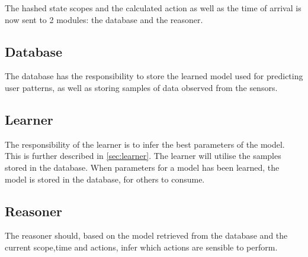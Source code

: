 The hashed state scopes and the calculated action as well as the time of arrival is now sent to 2 modules: the database and the reasoner.

\subsection{Database}
The database has the responsibility to store the learned model used for predicting user patterns, as well as storing samples of data observed from the sensors.

\subsection{Learner}
The responsibility of the learner is to infer the best parameters of the model. This is further described in \cref{sec:learner}. The learner will utilise the samples stored in the database. When parameters for a model has been learned, the model is stored in the database, for others to consume.

\subsection{Reasoner}
The reasoner should, based on the model retrieved from the database and the current scope,time and actions, infer which actions are sensible  to perform.
